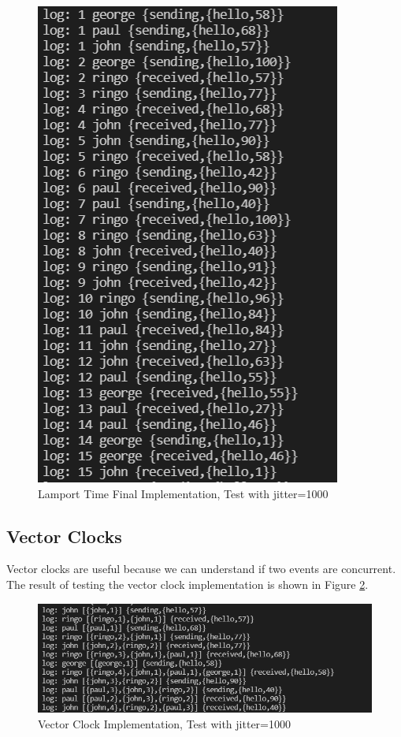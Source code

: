 \documentclass[a4paper, 11pt]{article}
\begin{document}
\begin{figure}
  \begin{center}
    \includegraphics[scale=0.3]{exp4.PNG}
    \caption{Lamport Time Final Implementation, Test with jitter=1000}
    \label{exp4}
  \end{center}
\end{figure}

\subsection{Vector Clocks}
Vector clocks are useful because we can understand if two events are concurrent. The result of testing the vector clock implementation is shown in Figure \ref{exp5}. 

\begin{figure}
  \begin{center}
    \includegraphics[scale=0.3]{exp5.PNG}
    \caption{Vector Clock Implementation, Test with jitter=1000}
    \label{exp5}
  \end{center}
\end{figure}
\end{document}
